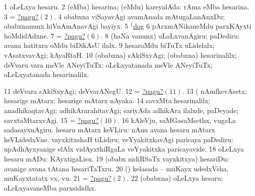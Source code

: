 \noindent
\gl{\pagu}
\bmng
\bnum
\num{1}  oLeLxya hesaru. 
\hypertarget{name1pagu2}{} 
\num{2}  (eMba) hesarina; (eMdu) kareyalAda:  rAma eMba hesarina. 
\num{3}  = \hyperlink{name1pagu2}{?pagu?\((2)\)}. 
\num{4}  obabxna viSayavAgi avamAnada mAtugaLanAnxDu; obabxnanunx hiVnAmAnavAgi bayiyx. 
\num{5}  \hyperref{kandict_d.pdf}{D}{dog(1) nuga(10)}{$^1$dog}  
\hypertarget{name1pagu6}{} 
\num{6}  pArxmANikaneMdu parxKAyxti hoMdidAdxne. 
\num{7}  = \hyperlink{name1pagu6}{?pagu?\((6)\)}. 
\num{8}  (haNa \mo vanunx) uLaLxvanAgiru; paDediru:  avana hatitxra oMdu biDikAsU ilalx. 
\num{9}  hesaroMdu biTuTx uLidelalx; vAsatxvavAgi; kAyaRtaH. 
\hypertarget{namepagu10}{} 
\num{10} (obabxna) sAkiSxyAgi; (obabxna) hesarinalilx; deVvaru \mo vara meVle ANeyiTuTx:  oLeLxyatanada meVle ANeyiTuTx; oLeLxyatanada hesarinalilx. 
\hypertarget{namepagu11}{} 
\num{11}  deVvara sAkiSxyAgi; deVvarANegU. 
\num{12}  = \hyperlink{namepagu11}{?pagu?\((11)\)}. 
\num{13}  (  nAmfkevAsetx; hesarige mAtarx:  hesarige mAtarx nAyaka. 
\num{14}  savxMta hesarinalilx; anadhikaqtavAgi; adhikArarahitavAgi; sariyAda adhikAra ilalxde, paDeyade; savxtaMtarxvAgi. 
\num{15}  = \hyperlink{namepagu10}{?pagu?\((10)\)}. 
\num{16}  kAleVju, saMGasaMsethx, \mo vugaLa sadasayxnAgiru. 
  
\banum
{} hesaru mAtarx keVLiru:  nAnu avana hesaru mAtarx keVLidedxVne. 
 vayxkitxshaH tiLidiru; veYyakitxkavAgi paricaya paDediru:  upAdhAyxyanige elAlx vidAyxthiRgaLa veYyakitxka paricayavide. 
\hypertarget{name1pagu18}{} 
\eanum
\numie
\num{18}  oLeLxya hesaru mADu: KAyxtigaLisu. 
\num{19}  (obabx nidiRSaTx vayxkitxya) hesariDu:  avanige avana tAtana hesariTaTxru. 
\num{20}  (\AmA) kelasada -- muKayx udedxVsha, muKayxtatatx vx, \mo vu. 
\num{21}  = \hyperlink{name1pagu2}{?pagu?\((2)\)}. 
\num{22}  (obabxna) oLeLxya hesaru; oLeLxyavaneMba parxsididhx. 
